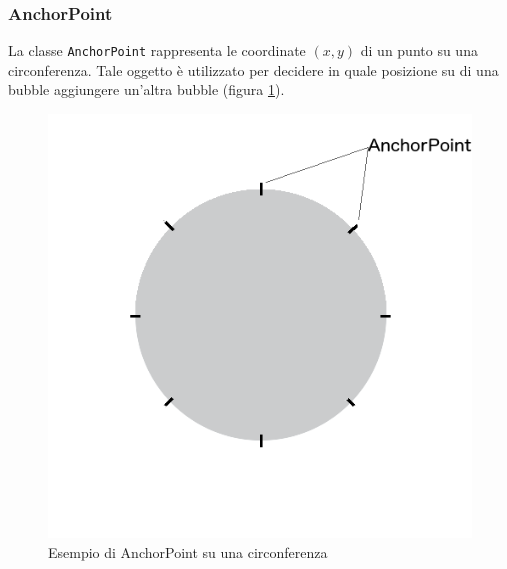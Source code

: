 \subsubsection{AnchorPoint}

La classe \texttt{AnchorPoint} rappresenta le coordinate $(x,y)$ di un punto su una circonferenza. Tale oggetto è utilizzato per decidere in quale posizione su di una bubble aggiungere un'altra bubble (figura \ref{fig:anchor}). 

\begin{figure}[!htbp]
\centering
\includegraphics[scale=0.4]{dettagli/anchor.png}
\caption{Esempio di AnchorPoint su una circonferenza}
\label{fig:anchor}
\end{figure}

